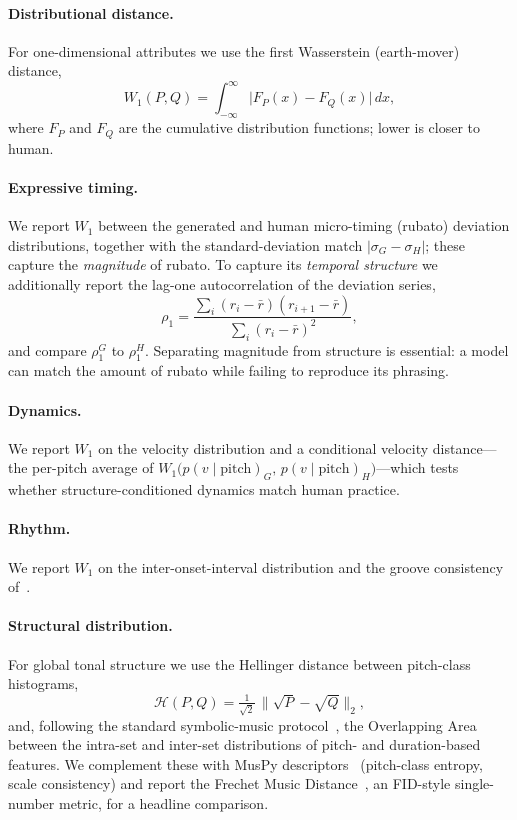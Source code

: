 \documentclass[review]{elsarticle}
\begin{document}
\paragraph{Distributional distance.} For one-dimensional attributes we use the first
Wasserstein (earth-mover) distance,
\begin{equation}
W_1(P,Q)=\int_{-\infty}^{\infty}\big|F_P(x)-F_Q(x)\big|\,dx,
\end{equation}
where $F_P$ and $F_Q$ are the cumulative distribution functions; lower is closer to human.

\paragraph{Expressive timing.} We report $W_1$ between the generated and human micro-timing
(rubato) deviation distributions, together with the standard-deviation match
$|\sigma_G-\sigma_H|$; these capture the \emph{magnitude} of rubato. To capture its
\emph{temporal structure} we additionally report the lag-one autocorrelation of the
deviation series,
\begin{equation}
\rho_1=\frac{\sum_i (r_i-\bar r)(r_{i+1}-\bar r)}{\sum_i (r_i-\bar r)^2},
\end{equation}
and compare $\rho_1^{G}$ to $\rho_1^{H}$. Separating magnitude from structure is essential:
a model can match the amount of rubato while failing to reproduce its phrasing.

\paragraph{Dynamics.} We report $W_1$ on the velocity distribution and a conditional
velocity distance---the per-pitch average of
$W_1\!\big(p(v\mid\text{pitch})_G,\,p(v\mid\text{pitch})_H\big)$---which tests whether
structure-conditioned dynamics match human practice.

\paragraph{Rhythm.} We report $W_1$ on the inter-onset-interval distribution and the groove
consistency of~\cite{dong2020muspy}.

\paragraph{Structural distribution.} For global tonal structure we use the Hellinger
distance between pitch-class histograms,
\begin{equation}
\mathcal{H}(P,Q)=\tfrac{1}{\sqrt{2}}\,\big\|\sqrt{P}-\sqrt{Q}\big\|_2 ,
\end{equation}
and, following the standard symbolic-music protocol~\cite{yang2020eval}, the Overlapping
Area between the intra-set and inter-set distributions of pitch- and duration-based
features. We complement these with MusPy descriptors~\cite{dong2020muspy} (pitch-class
entropy, scale consistency) and report the Frechet Music Distance~\cite{fmd2024}, an
FID-style single-number metric, for a headline comparison.
\end{document}
